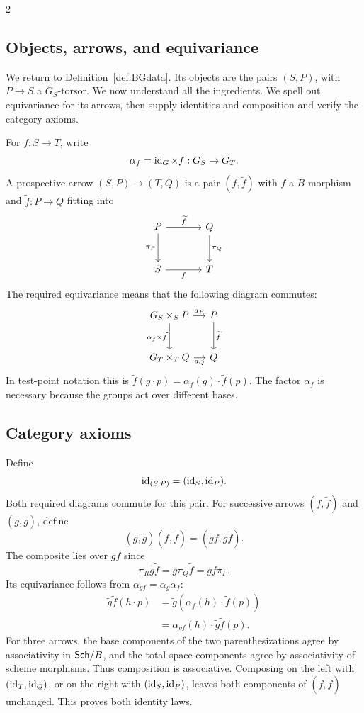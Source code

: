 \documentclass[12pt]{memoir}
\begin{document}
\begin{multicols}{2}
\subsection{Objects, arrows, and equivariance}
We return to Definition~\ref{def:BGdata}. Its objects are the pairs
$(S,P)$, with $P\to S$ a $G_S$-torsor. We now understand all the
ingredients. We spell out equivariance for its arrows, then supply
identities and composition and verify the category axioms.

For $f:S\to T$, write
\[
 \alpha_f=\operatorname{id}_G\times f:G_S\to G_T.
\]
A prospective arrow $(S,P)\to(T,Q)$ is a pair $(f,\widetilde f)$ with
$f$ a $B$-morphism and $\widetilde f:P\to Q$ fitting into
\[
\begin{tikzcd}[column sep=large,row sep=large]
P \arrow[r,"\widetilde f"] \arrow[d,"\pi_P"'] & Q \arrow[d,"\pi_Q"]\\
S \arrow[r,"f"'] & T
\end{tikzcd}
\]
The required equivariance means that the following diagram commutes:
\[
\begin{tikzcd}[column sep=small,row sep=large]
G_S\times_S P \arrow[r,"a_P"]
  \arrow[d,"\alpha_f\times\widetilde f"'] & P \arrow[d,"\widetilde f"]\\
G_T\times_T Q \arrow[r,"a_Q"'] & Q
\end{tikzcd}
\]
In test-point notation this is
$\widetilde f(g\cdot p)=\alpha_f(g)\cdot\widetilde f(p)$.
The factor $\alpha_f$ is necessary because the groups act over different
bases.

\subsection{Category axioms}
Define
\[
 \operatorname{id}_{(S,P)}=(\operatorname{id}_S,\operatorname{id}_P).
\]
Both required diagrams commute for this pair. For successive arrows
$(f,\widetilde f)$ and $(g,\widetilde g)$, define
\[
 (g,\widetilde g)(f,\widetilde f)
 =(gf,\widetilde g\widetilde f).
\]
The composite lies over $gf$ since
\[
 \pi_R\widetilde g\widetilde f
 =g\pi_Q\widetilde f=gf\pi_P.
\]
Its equivariance follows from $\alpha_{gf}=\alpha_g\alpha_f$:
\[
\begin{aligned}
 \widetilde g\widetilde f(h\cdot p)
 &=\widetilde g(\alpha_f(h)\cdot\widetilde f(p))\\
 &=\alpha_{gf}(h)\cdot\widetilde g\widetilde f(p).
\end{aligned}
\]
For three arrows, the base components of the two parenthesizations agree
by associativity in $\mathsf{Sch}/B$, and the total-space components agree by
associativity of scheme morphisms. Thus composition is associative.
Composing on the left with $(\operatorname{id}_T,\operatorname{id}_Q)$, or on the right with
$(\operatorname{id}_S,\operatorname{id}_P)$, leaves both components of $(f,\widetilde f)$ unchanged.
This proves both identity laws.


\end{multicols}
\end{document}
